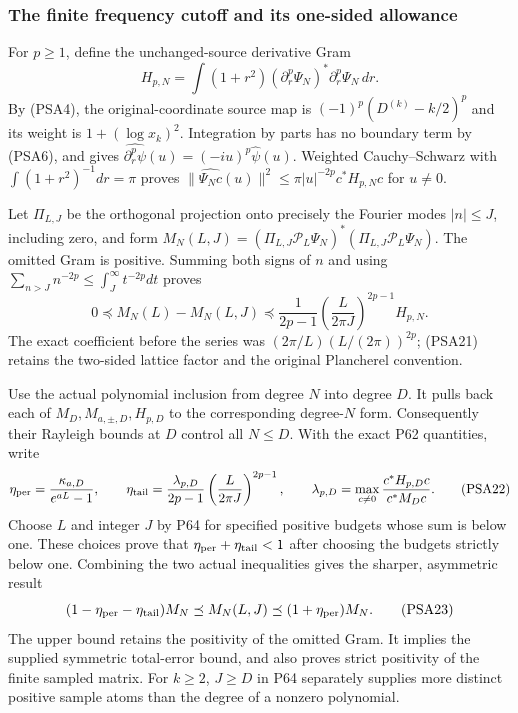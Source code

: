 \subsubsection{The finite frequency cutoff and its one-sided allowance}

For $p\ge1$, define the unchanged-source derivative Gram
\[
 H_{p,N}=\int(1+r^2)(\partial_r^p\Psi_N)^*
                            \partial_r^p\Psi_N\,dr.
 \tag{PSA20}
\]
By (PSA4), the original-coordinate source map is
$(-1)^p(D^{(k)}-k/2)^p$ and its weight is
$1+(\log x_k)^2$. Integration by parts has no boundary term by
(PSA6), and gives
$\widehat{\partial_r^p\psi}(u)=(-iu)^p\widehat\psi(u)$.
Weighted Cauchy--Schwarz with
$\int(1+r^2)^{-1}dr=\pi$ proves
$\|\widehat{\Psi_Nc}(u)\|^2\le\pi|u|^{-2p}c^*H_{p,N}c$
for $u\ne0$.

Let $\Pi_{L,J}$ be the orthogonal projection onto precisely the
Fourier modes $|n|\le J$, including zero, and form
$M_N(L,J)=(\Pi_{L,J}\mathcal P_L\Psi_N)^*
                (\Pi_{L,J}\mathcal P_L\Psi_N)$.
The omitted Gram is positive. Summing both signs of $n$ and using
$\sum_{n>J}n^{-2p}\le\int_J^\infty t^{-2p}dt$ proves
\[
 0\preceq M_N(L)-M_N(L,J)
 \preceq\frac1{2p-1}
             \left(\frac{L}{2\pi J}\right)^{2p-1}H_{p,N}.
 \tag{PSA21}
\]
The exact coefficient before the series was
$(2\pi/L)(L/(2\pi))^{2p}$; (PSA21) retains the two-sided lattice
factor and the original Plancherel convention.

Use the actual polynomial inclusion from degree $N$ into degree $D$.
It pulls back each of $M_D,M_{a,\pm,D},H_{p,D}$ to the corresponding
degree-$N$ form. Consequently their Rayleigh bounds at $D$ control all
$N\le D$. With the exact P62 quantities, write
\[
 \eta_{\rm per}=\frac{\kappa_{a,D}}{e^{aL}-1},\qquad
 \eta_{\rm tail}=\frac{\lambda_{p,D}}{2p-1}
          \left(\frac{L}{2\pi J}\right)^{2p-1},\qquad
 \lambda_{p,D}=\max_{c\ne0}\frac{c^*H_{p,D}c}{c^*M_Dc}.
 \tag{PSA22}
\]
Choose $L$ and integer $J$ by P64 for specified positive budgets
whose sum is below one. These choices prove that
$\eta_{\rm per}+\eta_{\rm tail}<1$ after choosing the budgets
strictly below one. Combining the two actual inequalities gives the
sharper, asymmetric result
\[
 (1-\eta_{\rm per}-\eta_{\rm tail})M_N
 \preceq M_N(L,J)\preceq(1+\eta_{\rm per})M_N.
 \tag{PSA23}
\]
The upper bound retains the positivity of the omitted Gram. It implies
the supplied symmetric total-error bound, and also proves strict
positivity of the finite sampled matrix. For $k\ge2$, $J\ge D$ in
P64 separately supplies more distinct positive sample atoms than the
degree of a nonzero polynomial.

